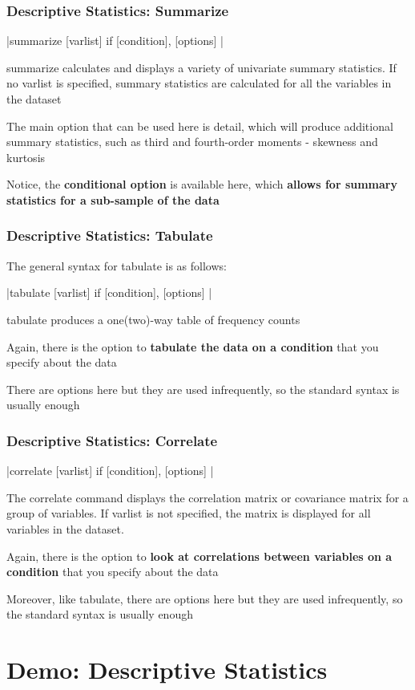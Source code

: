 \documentclass[10pt, compress]{beamer}
\begin{document}
\begin{frame}[fragile]
\frametitle{Descriptive Statistics: Summarize}

\begin{center}
|summarize [varlist] if [condition], [options] |
\end{center}

\alert{summarize} calculates and displays a variety of univariate summary statistics. If no \alert{varlist} is specified, summary statistics are calculated for all the variables in the dataset

The main option that can be used here is \alert{detail}, which will produce additional summary statistics, such as \alert{third and fourth-order moments - skewness and kurtosis} 

Notice, the \textbf{conditional option} is available here, which \textbf{allows for summary statistics for a sub-sample of the data}

\end{frame}

\begin{frame}[fragile]
\frametitle{Descriptive Statistics: Tabulate}

The \alert{general syntax} for \alert{tabulate} is as follows:

\begin{center}
|tabulate [varlist] if [condition], [options] |
\end{center}

\alert{tabulate} produces a one(two)-way table of frequency counts

Again, there is the option to \textbf{tabulate the data on a condition} that you specify about the data

There are options here but they are \alert{used infrequently}, so the standard syntax is \alert{usually} enough
\end{frame}

\begin{frame}[fragile]
\frametitle{Descriptive Statistics: Correlate}

\begin{center}
|correlate [varlist] if [condition], [options] |
\end{center}

The \alert{correlate} command displays the correlation matrix or covariance matrix for a group of
variables. If \alert{varlist is not specified}, the matrix is displayed for \alert{all variables} in the dataset.

Again, there is the option to \textbf{look at correlations between variables on a condition} that you specify about the data

Moreover, like tabulate, there are options here but they are \alert{used infrequently}, so the standard syntax is \alert{usually} enough

\end{frame}

\section{Demo: Descriptive Statistics} 

\end{document}
